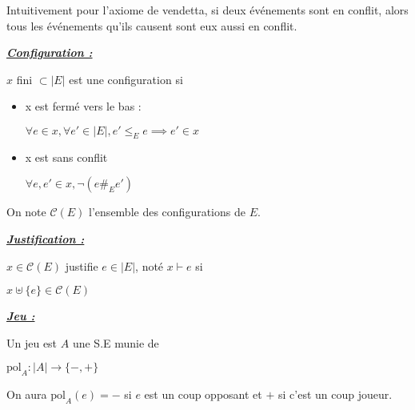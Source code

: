\documentclass[a4paper,12ptCOUCOU
]{article}
\newlength{\mydepth}
\newlength{\myheight}
\newenvironment{answer}
{\par\begin{lrbox}{\mybox}\quad\begin{minipage}{\linewidth}\color{black}\setlength{\parskip}{10pt plus 1pt minus 1pt}\vspace*{-.7\baselineskip}}
{\end{minipage}\end{lrbox}
\settodepth{\mydepth}{\usebox{\mybox}}
\settoheight{\myheight}{\usebox{\mybox}}
\addtolength{\myheight}{\mydepth}
\noindent\makebox[0pt]{
  \color{gray}\hspace{-0pt}\rule[-\mydepth]{1pt}{\myheight}}
\usebox{\mybox}
  }
\begin{document}
Intuitivement pour l'axiome de vendetta, si deux événements sont en conflit,
alors tous les événements qu'ils causent sont eux aussi en conflit.

\vspace{0.4cm}\begin{minipage}{\linewidth}\textbf{\textit{\underline{ Configuration : }}} \begin{answer}

$x$ fini $\subset |E|$ est une configuration si
\begin{itemize}
\item x est fermé vers le bas :

$\forall e \in x, \forall e' \in |E|, e' \leq_E e \implies e' \in x$

\item x est sans conflit

$\forall e, e' \in x, \neg (e \#_E e')$
\end{itemize}
\end{answer}\end{minipage}

On note $\mathcal{C}(E)$ l'ensemble des configurations de $E$.

\vspace{0.4cm}\begin{minipage}{\linewidth}\textbf{\textit{\underline{ Justification : }}} \begin{answer}
$x \in \mathcal{C}(E)$ justifie $e \in |E|$, noté $x \vdash e$ si

$x \uplus \{e\} \in \mathcal{C}(E)$
\end{answer}\end{minipage}

\vspace{0.4cm}\begin{minipage}{\linewidth}\textbf{\textit{\underline{ Jeu : }}} \begin{answer}
Un jeu est $A$ une S.E munie de

$\text{pol}_A : |A| \rightarrow \{-, +\}$
\end{answer}\end{minipage}

On aura $\text{pol}_A(e) = -$ si $e$ est un coup opposant et $+$ si
c'est un coup joueur.
\end{document}
